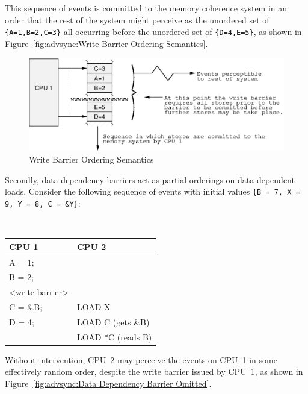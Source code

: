 This sequence of events is committed to the memory coherence system in an order
that the rest of the system might perceive as the unordered set of
{\tt \{A=1,B=2,C=3\}}
all occurring before the unordered set of
{\tt \{D=4,E=5\}}, as shown in
Figure~\ref{fig:advsync:Write Barrier Ordering Semantics}.

\begin{figure}[htb]
\centering
\includegraphics{advsync/WriteBarrierOrdering}
\caption{Write Barrier Ordering Semantics}
\end{figure}

Secondly, data dependency barriers act as partial orderings on data-dependent
loads.  Consider the following sequence of events with initial values
{\tt \{B = 7, X = 9, Y = 8, C = \&Y\}}:

\vspace{5pt}
\begin{minipage}[t]{\columnwidth}
\tt
\scriptsize
\begin{tabular}{l|p{1.5in}}
	CPU 1 &		CPU 2 \\
	\hline
	A = 1; & \\
	B = 2; & \\
	<write barrier> & \\
	C = \&B; & 	LOAD X\\
	D = 4;	&	LOAD C (gets \&B) \\
		&	LOAD *C (reads B) \\
\end{tabular}
\end{minipage}
\vspace{5pt}

Without intervention, CPU~2 may perceive the events on CPU~1 in some
effectively random order, despite the write barrier issued by CPU~1, as
shown in Figure~\ref{fig:advsync:Data Dependency Barrier Omitted}.

